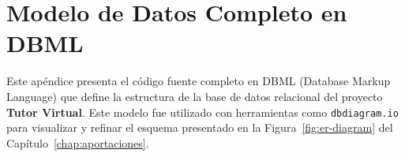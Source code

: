 \appendix %

\chapter{Modelo de Datos Completo en DBML}
\label{apx:modelo_dbml_completo}

Este apéndice presenta el código fuente completo en DBML (Database Markup Language) que define la estructura de la base de datos relacional del proyecto \textbf{Tutor Virtual}. Este modelo fue utilizado con herramientas como \texttt{dbdiagram.io} para visualizar y refinar el esquema presentado en la Figura~\ref{fig:er-diagram} del Capítulo~\ref{chap:aportaciones}.


